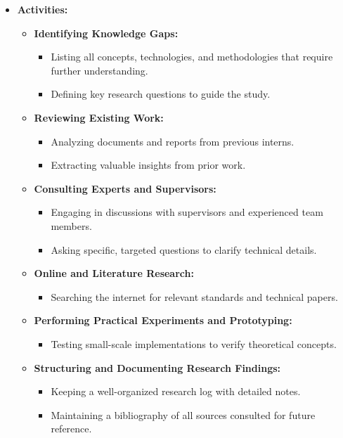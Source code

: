 \documentclass{article}
\begin{document}
\begin{itemize}[leftmargin=*, label={}]
    \item \textbf{Activities:}
    \begin{itemize}
        \item \textbf{Identifying Knowledge Gaps:}
        \begin{itemize}
            \item Listing all concepts, technologies, and methodologies that require further understanding.
            \item Defining key research questions to guide the study.
        \end{itemize}
        \item \textbf{Reviewing Existing Work:}
        \begin{itemize}
            \item Analyzing documents and reports from previous interns.
            \item Extracting valuable insights from prior work.
        \end{itemize}
        \item \textbf{Consulting Experts and Supervisors:}
        \begin{itemize}
            \item Engaging in discussions with supervisors and experienced team members.
            \item Asking specific, targeted questions to clarify technical details.
        \end{itemize}
        \item \textbf{Online and Literature Research:}
        \begin{itemize}
            \item Searching the internet for relevant standards and technical papers. 
        \end{itemize}
        \item \textbf{Performing Practical Experiments and Prototyping:}
        \begin{itemize}
            \item Testing small-scale implementations to verify theoretical concepts.
        \end{itemize}
        \item \textbf{Structuring and Documenting Research Findings:}
        \begin{itemize}
            \item Keeping a well-organized research log with detailed notes.
            \item Maintaining a bibliography of all sources consulted for future reference.
        \end{itemize}
    \end{itemize}


\end{itemize}
\end{document}
